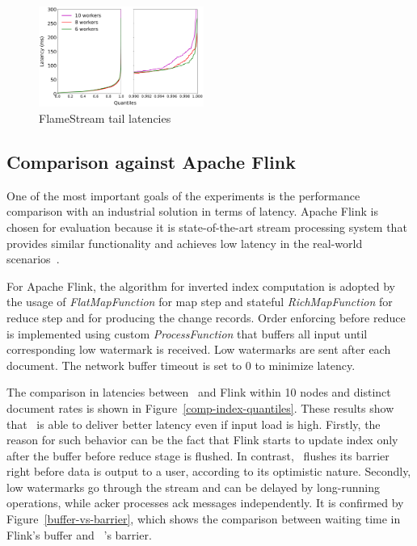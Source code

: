 \begin{figure}[htbp]
  \centering
  \includegraphics[width=0.48\textwidth]{pics/fs-index-quantiles}
  \caption{FlameStream tail latencies}
  \label {fs-index-quantiles}
\end{figure}

\subsection{Comparison against Apache Flink}

One of the most important goals of the experiments is the performance comparison with an industrial solution in terms of latency. Apache Flink is chosen for evaluation because it is state-of-the-art stream processing system that provides similar functionality and achieves low latency in the real-world scenarios~\cite{S7530084}. 

For Apache Flink, the algorithm for inverted index computation is adopted by the usage of {\it FlatMapFunction} for map step and stateful {\it RichMapFunction} for reduce step and for producing the change records. Order enforcing before reduce is implemented using custom {\it ProcessFunction} that buffers all input until corresponding low watermark is received. Low watermarks are sent after each document. The network buffer timeout is set to 0 to minimize latency.

The comparison in latencies between \FlameStream\ and Flink within 10 nodes and distinct document rates is shown in Figure~\ref{comp-index-quantiles}. These results show that \FlameStream\ is able to deliver better latency even if input load is high. Firstly, the reason for such behavior can be the fact that Flink starts to update index only after the buffer before reduce stage is flushed. In contrast, \FlameStream\ flushes its barrier right before data is output to a user, according to its optimistic nature. Secondly, low watermarks go through the stream and can be delayed by long-running operations, while acker processes ack messages independently. It is confirmed by Figure~\ref{buffer-vs-barrier}, which shows the comparison between waiting time in Flink's buffer and \FlameStream\ 's barrier. 
